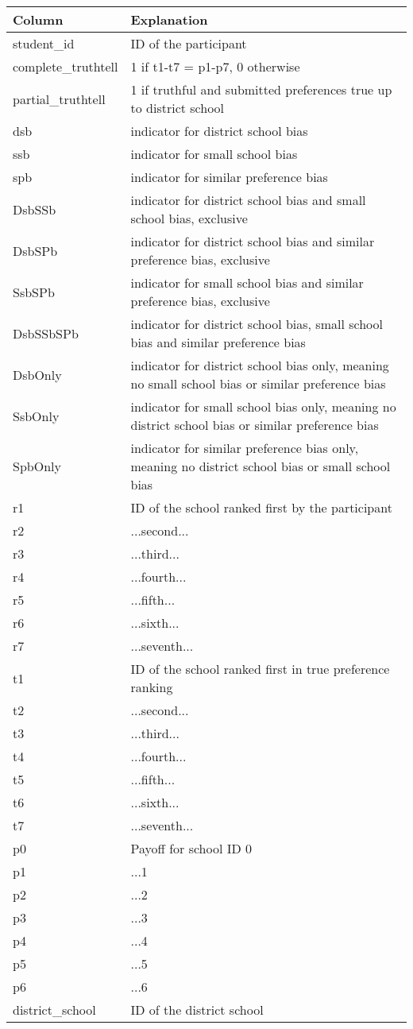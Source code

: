 \begin{tabular}{p{3cm}p{7cm}}
\toprule
Column & Explanation \\
\midrule
student_id & ID of the participant \\
complete_truthtell & 1 if t1-t7 = p1-p7, 0 otherwise \\
partial_truthtell & 1 if truthful and submitted preferences true up to district school \\
dsb & indicator for district school bias \\
ssb & indicator for small school bias \\
spb & indicator for similar preference bias \\
DsbSSb & indicator for district school bias and small school bias, exclusive \\
DsbSPb & indicator for district school bias and similar preference bias, exclusive \\
SsbSPb & indicator for small school bias and similar preference bias, exclusive \\
DsbSSbSPb & indicator for district school bias, small school bias and similar preference bias \\
DsbOnly & indicator for district school bias only, meaning no small school bias or similar preference bias \\
SsbOnly & indicator for small school bias only, meaning no district school bias or similar preference bias \\
SpbOnly & indicator for similar preference bias only, meaning no district school bias or small school bias \\
r1 & ID of the school ranked first by the participant \\
r2 & ...second... \\
r3 & ...third... \\
r4 & ...fourth... \\
r5 & ...fifth... \\
r6 & ...sixth... \\
r7 & ...seventh... \\
t1 & ID of the school ranked first in true preference ranking \\
t2 & ...second... \\
t3 & ...third... \\
t4 & ...fourth... \\
t5 & ...fifth... \\
t6 & ...sixth... \\
t7 & ...seventh... \\
p0 & Payoff for school ID 0 \\
p1 & ...1 \\
p2 & ...2 \\
p3 & ...3 \\
p4 & ...4 \\
p5 & ...5 \\
p6 & ...6 \\
district_school & ID of the district school \\
\bottomrule
\end{tabular}
